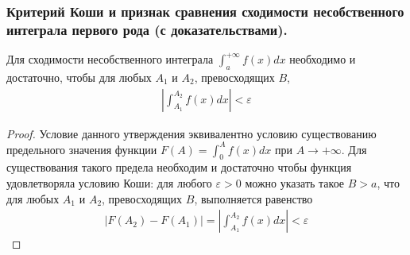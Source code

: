 \documentclass[10pt]{article}
\begin{document}
    \subsubsection{Критерий Коши и признак сравнения сходимости несобственного интеграла первого рода (с доказательствами).}
    \begin{corollary}
        Для сходимости несобственного интеграла $\int_{a}^{+\infty} f(x) dx$ необходимо и достаточно, чтобы для любых $A_1$ и $A_2$, превосходящих $B$,
        \begin{gather*}
            \left| \int_{A_1}^{A_2} f(x) dx \right| < \varepsilon
        \end{gather*}
    \end{corollary}
    \begin{proof}
        Условие данного утверждения эквивалентно условию существованию предельного значения функции $F(A) = \int_{0}^{A} f(x) dx$ при $A \to +\infty$. Для существования такого предела необходим и достаточно чтобы функция удовлетворяла условию Коши: для любого $\varepsilon>0$ можно указать такое $B>a$, что для любых $A_1$ и $A_2$, превосходящих $B$, выполняется равенство
        \begin{gather*}
            |F(A_2) - F(A_1)| = \left| \int_{A_1}^{A_2} f(x) dx \right| < \varepsilon
        \end{gather*} 
    \end{proof}
\end{document}
